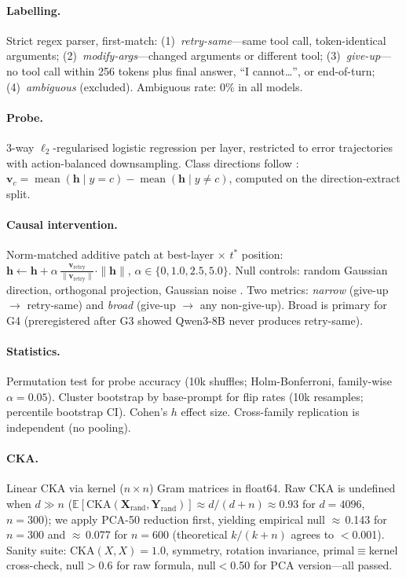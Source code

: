 \documentclass{article}
\begin{document}
\paragraph{Labelling.}
Strict regex parser, first-match: (1)~\textit{retry-same}---same tool
call, token-identical arguments; (2)~\textit{modify-args}---changed
arguments or different tool; (3)~\textit{give-up}---no tool call within
256 tokens plus final answer, ``I cannot\ldots'', or end-of-turn;
(4)~\textit{ambiguous} (excluded).  Ambiguous rate: 0\% in all models.

\paragraph{Probe.}
3-way $\ell_2$-regularised logistic regression per layer, restricted
to error trajectories with action-balanced downsampling.
Class directions follow \citet{zou2023representation}:
$\mathbf{v}_c = \operatorname{mean}(\mathbf{h}\mid y{=}c)
             - \operatorname{mean}(\mathbf{h}\mid y{\neq}c)$,
computed on the direction-extract split.

\paragraph{Causal intervention.}
Norm-matched additive patch at best-layer $\times$ $t^*$ position:
$\mathbf{h} \leftarrow \mathbf{h}
  + \alpha\,\frac{\mathbf{v}_\text{retry}}{\|\mathbf{v}_\text{retry}\|}
  \cdot\|\mathbf{h}\|$,
$\alpha\in\{0, 1.0, 2.5, 5.0\}$.
Null controls: random Gaussian direction, orthogonal projection,
Gaussian noise \citep{heimersheim2024activation}.
Two metrics: \emph{narrow} (give-up $\to$ retry-same) and \emph{broad}
(give-up $\to$ any non-give-up).  Broad is primary for G4 (preregistered
after G3 showed Qwen3-8B never produces retry-same).

\paragraph{Statistics.}
Permutation test for probe accuracy (10k shuffles; Holm-Bonferroni,
family-wise $\alpha{=}0.05$).  Cluster bootstrap by base-prompt for
flip rates (10k resamples; percentile bootstrap CI).  Cohen's $h$ effect size.
Cross-family replication is independent (no pooling).

\paragraph{CKA.}
Linear CKA \citep{kornblith2019similarity} via kernel ($n{\times}n$)
Gram matrices in float64.  Raw CKA is undefined when $d{\gg}n$
($\mathbb{E}[\text{CKA}(\mathbf{X}_\text{rand},\mathbf{Y}_\text{rand})]
\approx d/(d+n) \approx 0.93$ for $d{=}4096$, $n{=}300$); we apply
PCA-50 reduction first, yielding empirical null $\approx$\,0.143 for
$n{=}300$ and $\approx$\,0.077 for $n{=}600$ (theoretical $k/(k+n)$
agrees to $<$0.001).  Sanity suite: $\text{CKA}(X,X){=}1.0$,
symmetry, rotation invariance, primal$\equiv$kernel cross-check,
null$>$0.6 for raw formula, null$<$0.50 for PCA version---all passed.
\end{document}
